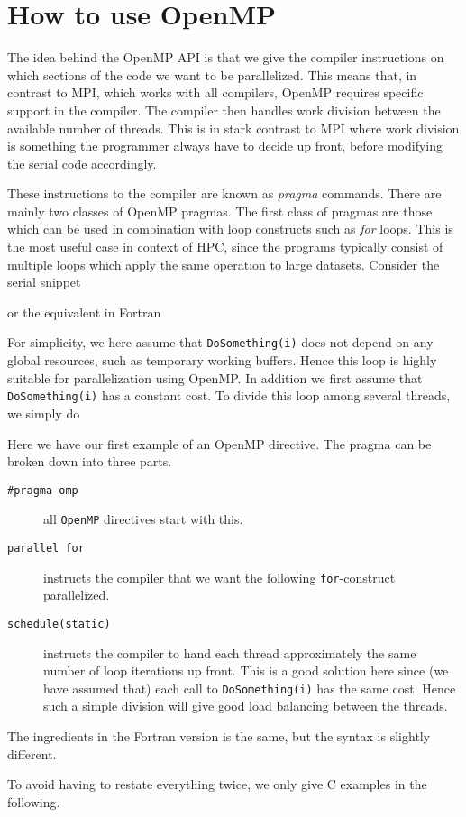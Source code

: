 \section{How to use OpenMP}

The idea behind the OpenMP API is that we give the compiler instructions on
which sections of the code we want to be parallelized. This means that, in
contrast to MPI, which works with all compilers, OpenMP requires specific
support in the compiler. The compiler then handles work division between the
available number of threads. This is in stark contrast to MPI where work
division is something the programmer always have to decide up front, before
modifying the serial code accordingly.

These instructions to the compiler are known as \emph{pragma} commands. There
are mainly two classes of OpenMP pragmas. The first class of pragmas are those
which can be used in combination with loop constructs such as \emph{for} loops.
This is the most useful case in context of HPC, since the programs typically
consist of multiple loops which apply the same operation to large datasets.
Consider the serial snippet

or the equivalent in Fortran


For simplicity, we here assume that \texttt{DoSomething(i)} does not depend on
any global resources, such as temporary working buffers. Hence this loop is
highly suitable for parallelization using OpenMP. In addition we first assume
that \texttt{DoSomething(i)} has a constant cost. To divide this loop among
several threads, we simply do

Here we have our first example of an OpenMP directive. The pragma can be broken
down into three parts.
\begin{description}
\item[\texttt{\#pragma omp}] all \texttt{OpenMP} directives start with this.
\item[\texttt{parallel for}] instructs the compiler that we want the following
  \texttt{for}-construct parallelized.
\item[\texttt{schedule(static)}] instructs the compiler to hand each thread
  approximately the same number of loop iterations up front. This is a good
  solution here since (we have assumed that) each call to
  \texttt{DoSomething(i)} has the same cost. Hence such a simple division will
  give good load balancing between the threads.
\end{description}
The ingredients in the Fortran version is the same, but the syntax is slightly
different.

To avoid having to restate everything twice, we only give C examples in the
following.

